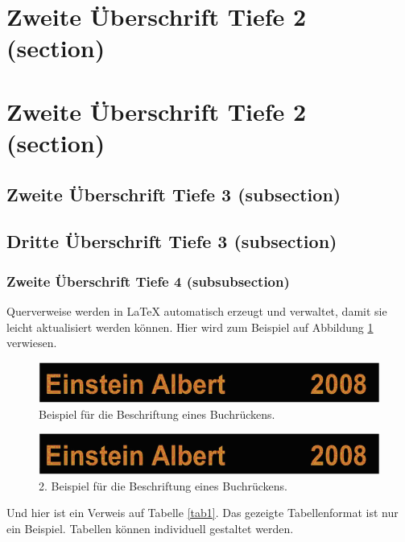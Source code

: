 \documentclass[MMR,Master,ngerman]{twbook}%
\begin{document}
\section{Zweite Überschrift Tiefe 2 (section)}
\blindtext

\section{Zweite Überschrift Tiefe 2 (section)}
\blindtext

\subsection{Zweite Überschrift Tiefe 3 (subsection)}
\blindtext

\subsection{Dritte Überschrift Tiefe 3 (subsection)}
\blindtext

\subsubsection{Zweite Überschrift Tiefe 4 (subsubsection)}
\blindtext

\noindent Querverweise werden in \LaTeX{} automatisch erzeugt und verwaltet, damit sie leicht aktualisiert werden können. Hier wird zum Beispiel auf Abbildung \ref{Abb1} verwiesen.

\begin{figure}[!htbp]
\centering
\includegraphics[width=0.5\linewidth]{PICs/buchruecken}
\caption{Beispiel für die Beschriftung eines Buchrückens.}\label{Abb1}
\end{figure}
\begin{figure}[!htbp]
\centering
\includegraphics[width=0.5\linewidth]{PICs/buchruecken}
\caption{2. Beispiel für die Beschriftung eines Buchrückens.}\label{Abb2}
\end{figure}

Und hier ist ein Verweis auf Tabelle \ref{tab1}. Das gezeigte Tabellenformat ist nur ein Beispiel. Tabellen können individuell gestaltet werden.
\end{document}
